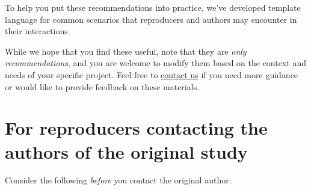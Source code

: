 \documentclass[
]{book}
\begin{document}
To help you put these recommendations into practice, we've developed template language for common scenarios that reproducers and authors may encounter in their interactions.

While we hope that you find these useful, note that they are \emph{only recommendations}, and you are welcome to modify them based on the context and needs of your specific project. Feel free to \href{mailto:acre@berkeley.edu}{contact us} if you need more guidance or would like to provide feedback on these materials.

\hypertarget{for-reproducers-contacting-the-authors-of-the-original-study}{%
\section{For reproducers contacting the authors of the original study}\label{for-reproducers-contacting-the-authors-of-the-original-study}}

Consider the following \emph{before} you contact the original author:
\end{document}
